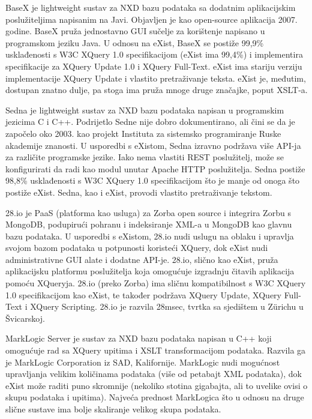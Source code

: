 \documentclass{foi}
\begin{document}
BaseX je lightweight sustav za NXD bazu podataka sa dodatnim aplikacijskim poslužiteljima napisanim na Javi. Objavljen je kao open-source aplikacija 2007. godine. BaseX pruža jednostavno GUI sučelje za korištenje napisano u programskom jeziku Java. U odnosu na eXist, BaseX se postiže 99,9\% usklađenosti s W3C XQuery 1.0 specifikacijom (eXist ima 99,4\%) i implementira specifikacije za XQuery Update 1.0 i XQuery Full-Text. eXist ima stariju verziju implementacije XQuery Update i vlastito pretraživanje teksta. eXist je, međutim, dostupan znatno dulje, pa stoga ima pruža mnoge druge značajke, poput XSLT-a.

Sedna je lightweight sustav za NXD bazu podataka napisan u programskim jezicima C i C++. Podrijetlo Sedne nije dobro dokumentirano, ali čini se da je započelo oko 2003. kao projekt Instituta za sistemsko programiranje Ruske akademije znanosti. U usporedbi s eXistom, Sedna izravno podržava više API-ja za različite programske jezike. Iako nema vlastiti REST poslužitelj, može se konfigurirati da radi kao modul unutar Apache HTTP poslužitelja. Sedna postiže 98,8\% usklađenosti s W3C XQuery 1.0 specifikacijom što je manje od onoga što postiže eXist. Sedna, kao i eXist, provodi vlastito pretraživanje tekstom.

28.io je PaaS (platforma kao usluga) za Zorba open source i integrira Zorbu s MongoDB, podupirući pohranu i indeksiranje XML-a u MongoDB kao glavnu bazu podataka. U usporedbi s eXistom, 28.io nudi uslugu na oblaku i upravlja svojom bazom podataka u potpunosti koristeći XQuery, dok eXist nudi administrativne GUI alate i dodatne API-je. 28.io, slično kao eXist, pruža aplikacijsku platformu poslužitelja koja omogućuje izgradnju čitavih aplikacija pomoću XQueryja. 28.io (preko Zorba) ima sličnu kompatibilnost s W3C XQuery 1.0 specifikacijom kao eXist, te također podržava XQuery Update, XQuery Full-Text i XQuery Scripting. 28.io je razvila 28msec, tvrtka sa sjedištem u Zürichu u Švicarskoj.

MarkLogic Server je sustav za NXD bazu podataka napisan u C++ koji omogućuje rad sa XQuery upitima i XSLT transformacijom podataka. Razvila ga je MarkLogic Corporation iz SAD, Kalifornije. MarkLogic nudi mogućnost upravljanja velikim količinama podataka (više od petabajt XML podataka), dok eXist može raditi puno skromnije (nekoliko stotina gigabajta, ali to uvelike ovisi o skupu podataka i upitima). Najveća prednost MarkLogica što u odnosu na druge slične sustave ima bolje skaliranje velikog skupa podataka. \cite{exist}
\end{document}

